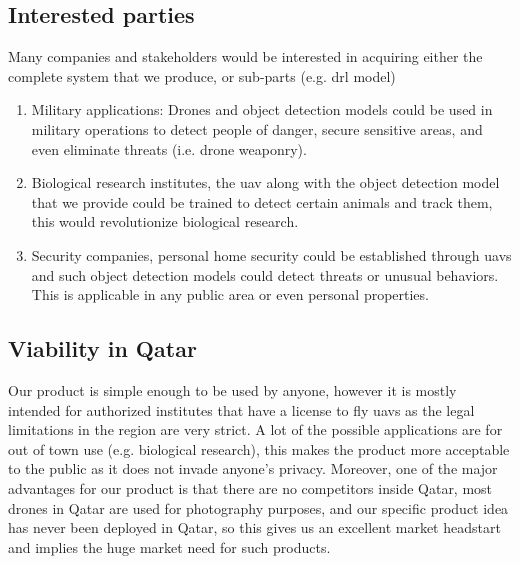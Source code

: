 \documentclass[../main.tex]{subfiles}
\begin{document}
\subsection{Interested parties}
	Many companies and stakeholders would be interested in acquiring either the
	complete system that we produce, or sub-parts (e.g. \gls{drl} model)
	\begin{enumerate}
		\item Military applications: Drones and object detection models could 
		be used in military operations to detect people of danger, secure 
		sensitive areas, and even eliminate threats (i.e. drone weaponry).
		
		\item Biological research institutes, the \gls{uav} along with the object
		detection model that we provide could be trained to detect certain animals 
		and track them, this would revolutionize biological research.
		
		\item Security companies, personal home security could be established through
		\glspl{uav} and such object detection models could detect threats or unusual
		behaviors. This is applicable in any public area or even personal properties.		
		
	\end{enumerate}

\subsection{Viability in Qatar}
	Our product is simple enough to be used by anyone, however it is mostly intended for 
	authorized institutes that have a license to fly \glspl{uav} as the legal limitations 
	in the region are very strict. 
	A lot of the possible applications are for out of town use (e.g. biological research), 
	this makes the product more acceptable to the public as it does not invade anyone's privacy.
	Moreover, one of the major advantages for our product is that there are no competitors 
	inside Qatar, most drones in Qatar are used for photography purposes, and our
	specific product idea has never been deployed in Qatar, so this gives us an excellent 
	market headstart and implies the huge market need for such products.
\end{document}
